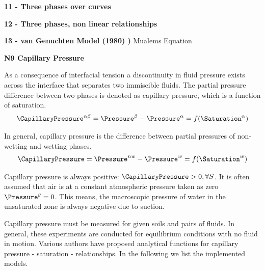 \textbf{11 - Three phases over curves} \vspace{5mm}

\textbf{12 - Three phases, non linear relationships} \vspace{5mm}


\textbf{13 - van Genuchten Model (1980) )} \vspace{5mm} Mualems
Equation


\vspace{5mm}

\textbf{N9  Capillary Pressure}

\vspace{5mm}

As a consequence of interfacial tension a discontinuity in fluid
pressure exists across the interface that separates two immiscible
fluids. The partial pressure difference between two phases is
denoted as capillary pressure, which is a function of saturation.
\begin{eqnarray}
\CapillaryPressure^{\alpha\beta} = \Pressure^\beta -
\Pressure^\alpha = f(\Saturation^\alpha)
\end{eqnarray}

In general, capillary pressure is the difference between partial
pressures of non-wetting and wetting phases.
\begin{eqnarray}
\CapillaryPressure = \Pressure^{nw} - \Pressure^w =
f(\Saturation^w) \label{eqn:capillary_pressure}
\end{eqnarray}

Capillary pressure is always positive: $\CapillaryPressure>0 ,
\forall S$. It is often assumed that air is at a constant
atmospheric pressure taken as zero $\Pressure^g=0$. This means,
the macroscopic pressure of water in the unsaturated zone is
always negative due to suction.

Capillary pressure must be measured for given soils and pairs of
fluids. In general, these experiments are conducted for
equilibrium conditions with no fluid in motion. Various authors
have proposed analytical functions for capillary pressure -
saturation - relationships. In the following we list the
implemented models.

